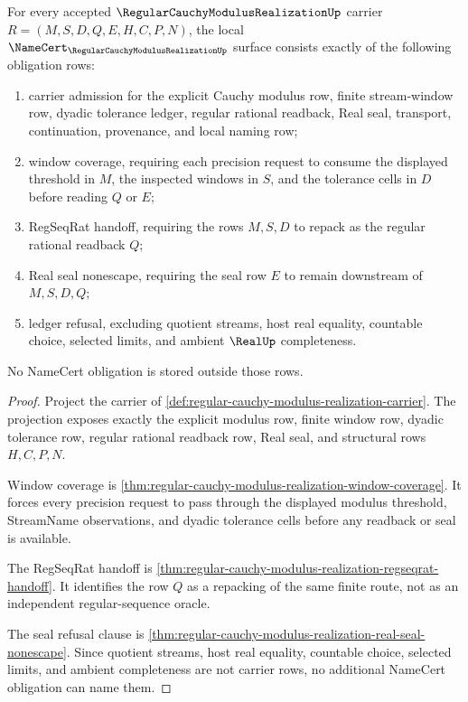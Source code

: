 \begin{theorem}
\label{thm:regular-cauchy-modulus-realization-namecert-obligations}
For every accepted $\RegularCauchyModulusRealizationUp$ carrier $R=(M,S,D,Q,E,H,C,P,N)$, the local $\NameCert_{\RegularCauchyModulusRealizationUp}$ surface consists exactly of the following obligation rows:
\begin{enumerate}
\item carrier admission for the explicit Cauchy modulus row, finite stream-window row, dyadic tolerance ledger, regular rational readback, Real seal, transport, continuation, provenance, and local naming row;
\item window coverage, requiring each precision request to consume the displayed threshold in $M$, the inspected windows in $S$, and the tolerance cells in $D$ before reading $Q$ or $E$;
\item RegSeqRat handoff, requiring the rows $M,S,D$ to repack as the regular rational readback $Q$;
\item Real seal nonescape, requiring the seal row $E$ to remain downstream of $M,S,D,Q$;
\item ledger refusal, excluding quotient streams, host real equality, countable choice, selected limits, and ambient $\RealUp$ completeness.
\end{enumerate}
No NameCert obligation is stored outside those rows.
\end{theorem}
\begin{proof}
Project the carrier of \autoref{def:regular-cauchy-modulus-realization-carrier}. The projection exposes exactly the explicit modulus row, finite window row, dyadic tolerance row, regular rational readback row, Real seal, and structural rows $H,C,P,N$.

Window coverage is \autoref{thm:regular-cauchy-modulus-realization-window-coverage}. It forces every precision request to pass through the displayed modulus threshold, StreamName observations, and dyadic tolerance cells before any readback or seal is available.

The RegSeqRat handoff is \autoref{thm:regular-cauchy-modulus-realization-regseqrat-handoff}. It identifies the row $Q$ as a repacking of the same finite route, not as an independent regular-sequence oracle.

The seal refusal clause is \autoref{thm:regular-cauchy-modulus-realization-real-seal-nonescape}. Since quotient streams, host real equality, countable choice, selected limits, and ambient completeness are not carrier rows, no additional NameCert obligation can name them.
\end{proof}

